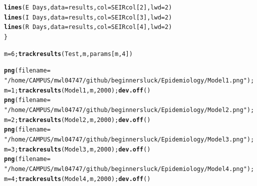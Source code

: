 \documentclass{article}\usepackage[]{graphicx}\usepackage[]{color}
\makeatletter
\newcommand{\hlnum}[1]{\textcolor[rgb]{0.686,0.059,0.569}{#1}}%
\newcommand{\hlstr}[1]{\textcolor[rgb]{0.192,0.494,0.8}{#1}}%
\newcommand{\hlopt}[1]{\textcolor[rgb]{0,0,0}{#1}}%
\newcommand{\hlstd}[1]{\textcolor[rgb]{0.345,0.345,0.345}{#1}}%
\newcommand{\hlkwb}[1]{\textcolor[rgb]{0.69,0.353,0.396}{#1}}%
\newcommand{\hlkwc}[1]{\textcolor[rgb]{0.333,0.667,0.333}{#1}}%
\newcommand{\hlkwd}[1]{\textcolor[rgb]{0.737,0.353,0.396}{\textbf{#1}}}%
\newenvironment{kframe}{%
 \def\at@end@of@kframe{}%
 \ifinner\ifhmode%
  \def\at@end@of@kframe{\end{minipage}}%
  \begin{minipage}{\columnwidth}%
 \fi\fi%
 \def\FrameCommand##1{\hskip\@totalleftmargin \hskip-\fboxsep
 \colorbox{shadecolor}{##1}\hskip-\fboxsep
     \hskip-\linewidth \hskip-\@totalleftmargin \hskip\columnwidth}%
 \MakeFramed {\advance\hsize-\width
   \@totalleftmargin\z@ \linewidth\hsize
   \@setminipage}}%
 {\par\unskip\endMakeFramed%
 \at@end@of@kframe}
\newenvironment{knitrout}{}{} %
\makeatother
\begin{document}
\begin{knitrout}
\begin{kframe}
\begin{alltt}
\hlkwd{lines}\hlstd{(E}\hlopt{~}\hlstd{Days,} \hlkwc{data}\hlstd{=results,} \hlkwc{col}\hlstd{=SEIRcol[}\hlnum{2}\hlstd{],} \hlkwc{lwd}\hlstd{=}\hlnum{2}\hlstd{)}
\hlkwd{lines}\hlstd{(I}\hlopt{~}\hlstd{Days,} \hlkwc{data}\hlstd{=results,} \hlkwc{col}\hlstd{=SEIRcol[}\hlnum{3}\hlstd{],} \hlkwc{lwd}\hlstd{=}\hlnum{2}\hlstd{)}
\hlkwd{lines}\hlstd{(R}\hlopt{~}\hlstd{Days,} \hlkwc{data}\hlstd{=results,} \hlkwc{col}\hlstd{=SEIRcol[}\hlnum{4}\hlstd{],} \hlkwc{lwd}\hlstd{=}\hlnum{2}\hlstd{)}
\hlstd{\}}

\hlstd{m} \hlkwb{=} \hlnum{6}\hlstd{;} \hlkwd{trackresults}\hlstd{(Test, m, params[m,}\hlnum{4}\hlstd{])}

\hlkwd{png}\hlstd{(}\hlkwc{filename} \hlstd{=}
  \hlstr{"/home/CAMPUS/mwl04747/github/beginnersluck/Epidemiology/Model1.png"}\hlstd{);}
  \hlstd{m} \hlkwb{=} \hlnum{1}\hlstd{;} \hlkwd{trackresults}\hlstd{(Model1, m,} \hlnum{2000}\hlstd{);} \hlkwd{dev.off}\hlstd{()}
\hlkwd{png}\hlstd{(}\hlkwc{filename} \hlstd{=}
  \hlstr{"/home/CAMPUS/mwl04747/github/beginnersluck/Epidemiology/Model2.png"}\hlstd{);}
  \hlstd{m} \hlkwb{=} \hlnum{2}\hlstd{;} \hlkwd{trackresults}\hlstd{(Model2, m,} \hlnum{2000}\hlstd{);} \hlkwd{dev.off}\hlstd{()}
\hlkwd{png}\hlstd{(}\hlkwc{filename} \hlstd{=}
  \hlstr{"/home/CAMPUS/mwl04747/github/beginnersluck/Epidemiology/Model3.png"}\hlstd{);}
  \hlstd{m} \hlkwb{=} \hlnum{3}\hlstd{;} \hlkwd{trackresults}\hlstd{(Model3, m,} \hlnum{2000}\hlstd{);} \hlkwd{dev.off}\hlstd{()}
\hlkwd{png}\hlstd{(}\hlkwc{filename} \hlstd{=}
  \hlstr{"/home/CAMPUS/mwl04747/github/beginnersluck/Epidemiology/Model4.png"}\hlstd{);}
  \hlstd{m} \hlkwb{=} \hlnum{4}\hlstd{;} \hlkwd{trackresults}\hlstd{(Model4, m,} \hlnum{2000}\hlstd{);} \hlkwd{dev.off}\hlstd{()}
\end{alltt}
\end{kframe}
\end{knitrout}
\end{document}

